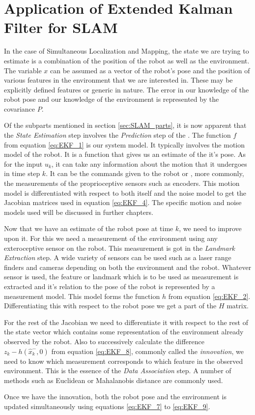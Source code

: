 \section{Application of Extended Kalman Filter for SLAM}
\label{sec:EKF_SLAM}
In the case of Simultaneous Localization and Mapping, the state we are trying to estimate is a combination of the position of the robot as well as the environment. The variable $ x $ can be assumed as a vector of the robot's pose and the position of various features in the environment that we are interested in. These may be explicitly defined features or generic in nature. The error in our knowledge of the robot pose and our knowledge of the environment is represented by the covariance $ P $. 

Of the subparts mentioned in section \ref{sec:SLAM_parts}, it is now apparent that the \textit{State Estimation} step involves the \textit{Prediction} step of the \ekf. The function $ f $ from equation \ref{eq:EKF_1} is our system model. It typically involves the motion model of the robot. It is a function that gives us an estimate of the it's pose. As for the input $ u_k $, it can take any information about the motion that it undergoes in time step $ k $. It can be the commands given to the robot or , more commonly, the measurements of the proprioceptive sensors such as encoders. This motion model is differentiated with respect to both itself and the noise model to get the Jacobian matrices used in equation \ref{eq:EKF_4}. The specific motion and noise models used will be discussed in further chapters.

Now that we have an estimate of the robot pose at time $ k $, we need to improve upon it. For this we need a measurement of the environment using any exteroceptive sensor on the robot. This measurement is got in the \textit{Landmark Extraction} step. A wide variety of sensors can be used such as a laser range finders and cameras depending on both the environment and the robot. Whatever sensor is used, the feature or landmark which is to be used as measurement is extracted and it's relation to the pose of the robot is represented by a measurement model. This model forms the function $ h $ from equation \ref{eq:EKF_2}. Differentiating this with respect to the robot pose we get a part of the $ H $ matrix. 

For the rest of the Jacobian we need to differentiate it with respect to the rest of the state vector which contains some representation of the environment already observed by the robot. Also to successively calculate the difference $ z_k-h(\hat{x}^-_k,0) $ from equation \ref{eq:EKF_8}, commonly called the \textit{innovation}, we need to know which measurement corresponds to which feature in the observed environment. This is the essence of the \textit{Data Association} step. A number of methods such as Euclidean or Mahalanobis\cite{Mahalanobis1936} distance are commonly used. 

Once we have the innovation, both the robot pose and the environment is updated simultaneously using equations \ref{eq:EKF_7} to \ref{eq:EKF_9}.